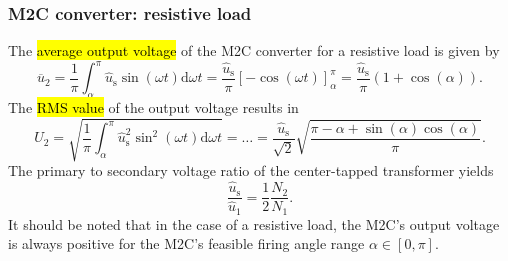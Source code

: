 \begin{frame}
    \frametitle{M2C converter: resistive load}
    The \hl{average output voltage} of the M2C converter for a resistive load is given by
    \begin{equation}
        \overline{u}_2 = \frac{1}{\pi} \int_{\alpha}^{\pi} \hat{u}_\mathrm{s} \sin(\omega t) \mathrm{d} \omega t = \frac{\hat{u}_\mathrm{s}}{\pi} \left[ -\cos(\omega t) \right]_{\alpha}^{\pi} = \frac{\hat{u}_\mathrm{s}}{\pi} \left( 1 + \cos(\alpha) \right).
    \end{equation}
    The \hl{RMS value} of the output voltage results in
    \begin{equation}
        U_2 = \sqrt{\frac{1}{\pi} \int_{\alpha}^{\pi} \hat{u}_\mathrm{s}^2 \sin^2(\omega t) \mathrm{d} \omega t} =   \ldots = \frac{\hat{u}_\mathrm{s}}{\sqrt{2}} \sqrt{\frac{\pi - \alpha + \sin(\alpha)\cos(\alpha)}{\pi}}.
    \end{equation}
    The primary to secondary voltage ratio of the center-tapped transformer yields
    \begin{equation*}
        \frac{\hat{u}_\mathrm{s}}{\hat{u}_1} = \frac{1}{2}\frac{N_2}{N_1}.
    \end{equation*}
    It should be noted that in the case of a resistive load, the M2C's output voltage is always positive for the M2C's feasible firing angle range $\alpha \in [0,\pi]$.
\end{frame}


